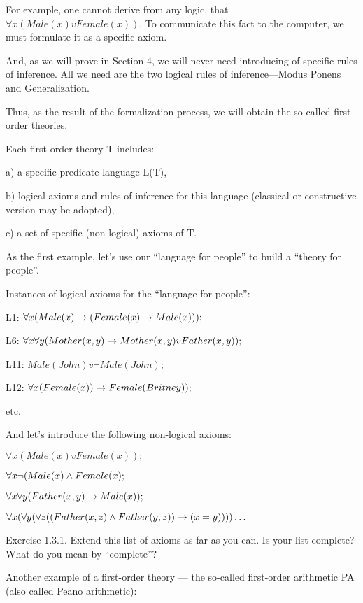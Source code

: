 For example, one cannot derive from any logic, that \(\forall x (Male(x) v Female(x))\). To communicate this fact to the computer, we must formulate it as a specific axiom.

And, as we will prove in Section 4, we will never need introducing of specific rules of inference. All we need are the two logical rules of inference---Modus Ponens and Generalization.

Thus, as the result of the formalization process, we will obtain the so-called first-order theories.

Each first-order theory T includes:

a) a specific predicate language L(T),

b) logical axioms and rules of inference for this language (classical or constructive version may be adopted),

c) a set of specific (non-logical) axioms of T.

As the first example, let's use our ``language for people'' to build a ``theory for people''.

Instances of logical axioms for the ``language for people'':

L1: \(\forall x(Male(x)\rightarrow (Female(x)\rightarrow Male(x)));\)

L6: \(\forall x\forall y(Mother(x, y)\rightarrow Mother(x, y) v Father(x, y));\)

L11: \(Male(John) v \neg Male(John);\)

L12: \(\forall x(Female(x))\rightarrow Female(Britney));\)

etc.

And let's introduce the following non-logical axioms:

\(\forall x (Male(x) v Female(x));\)

\(\forall x \neg (Male(x) \wedge  Female(x);\)

\(\forall x\forall y (Father (x, y)\rightarrow Male(x));\)

\(\forall x(\forall y(\forall z((Father(x, z)\wedge Father(y,z))\rightarrow (x=y)))) \ldots \)

Exercise 1.3.1. Extend this list of axioms as far as you can. Is your list complete? What do you mean by ``complete''?

Another example of a first-order theory --- the so-called first-order arithmetic PA (also called Peano arithmetic):

